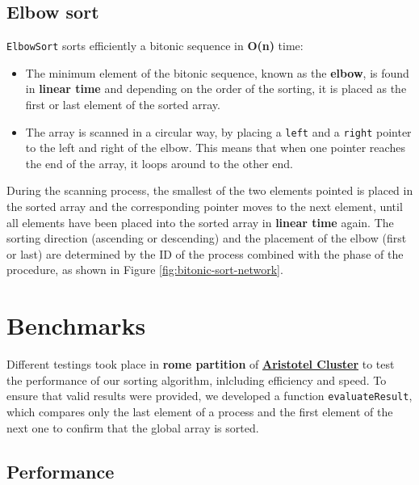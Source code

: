 \documentclass{article}
\begin{document}
\subsection{Elbow sort}
\texttt{ElbowSort} sorts efficiently a bitonic sequence in \textbf{O(n)} time:
\begin{itemize}
\item
The minimum element of the bitonic sequence, known as the \textbf{elbow}, is found in \textbf{linear time} and depending on the order of the sorting, it is placed as the first or last element of the sorted array.
\item 
The array is scanned in a circular way, by placing a \texttt{left} and a \texttt{right} pointer to the left and right of the elbow. This means that when one pointer reaches the end of the array, it loops around to the other end.  
\end{itemize}
During the scanning process, the smallest of the two elements pointed is placed in the sorted array and the corresponding pointer moves to the next element, until all elements have been placed into the sorted array in \textbf{linear time} again. The sorting direction (ascending or descending) and the placement of the elbow (first or last) are determined by the ID of the process combined with the phase of the procedure, as shown in Figure \ref{fig:bitonic-sort-network}.

\section{Benchmarks}
Different testings took place in \textbf{rome partition} of \href{https://hpc.it.auth.gr/}{\textbf{Aristotel Cluster}} to test the performance of our sorting algorithm, inlcluding efficiency and speed. To ensure that valid results were provided, we developed a function \texttt{evaluateResult}, which compares only the last element of a process and the first element of the next one to confirm that the global array is sorted.

\subsection{Performance}
\end{document}
